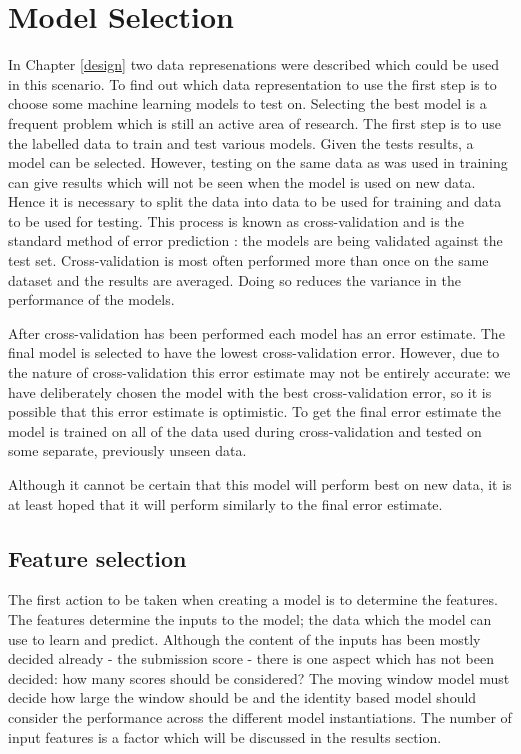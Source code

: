 \chapter{Model Selection}
\label{machinelearning}
In Chapter \ref{design} two data represenations were described which could be used in this scenario. To find out which data representation to use the first step is to choose some machine learning models to test on. Selecting the best model is a frequent problem which is still an active area of research. The first step is to use the labelled data to train and test various models. Given the tests results, a model can be selected. However, testing on the same data as was used in training can give results which will not be seen when the model is used on new data. Hence it is necessary to split the data into data to be used for training and data to be used for testing. This process is known as cross-validation and is the standard method of error prediction \cite{witten2011data}: the models are being validated against the test set. Cross-validation is most often performed more than once on the same dataset and the results are averaged. Doing so reduces the variance in the performance of the models.

After cross-validation has been performed each model has an error estimate. The final model is selected to have the lowest cross-validation error. However, due to the nature of cross-validation this error estimate may not be entirely accurate: we have deliberately chosen the model with the best cross-validation error, so it is possible that this error estimate is optimistic. To get the final error estimate the model is trained on all of the data used during cross-validation and tested on some separate, previously unseen data.

Although it cannot be certain that this model will perform best on new data, it is at least hoped that it will perform similarly to the final error estimate.

\section{Feature selection}
The first action to be taken when creating a model is to determine the features. The features determine the inputs to the model; the data which the model can use to learn and predict. Although the content of the inputs has been mostly decided already - the submission score - there is one aspect which has not been decided: how many scores should be considered? The moving window model must decide how large the window should be and the identity based model should consider the performance across the different model instantiations. The number of input features is a factor which will be discussed in the results section.

